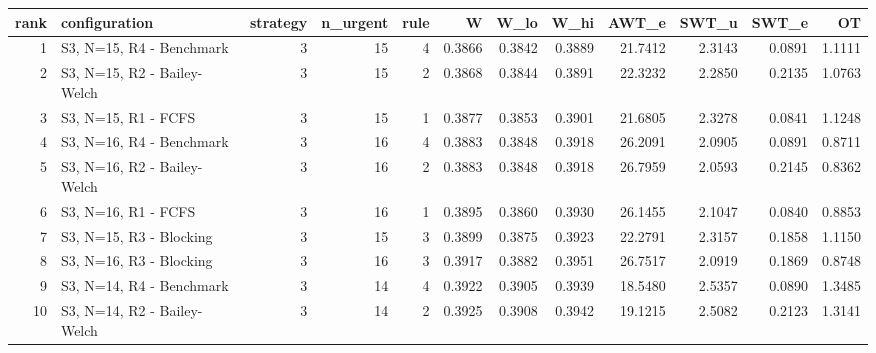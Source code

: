 \begin{tabular}{rlrrrrrrrrrr}
\toprule
rank & configuration & strategy & n_urgent & rule & W & W_lo & W_hi & AWT_e & SWT_u & SWT_e & OT \\
\midrule
1 & S3, N=15, R4 - Benchmark & 3 & 15 & 4 & 0.3866 & 0.3842 & 0.3889 & 21.7412 & 2.3143 & 0.0891 & 1.1111 \\
2 & S3, N=15, R2 - Bailey-Welch & 3 & 15 & 2 & 0.3868 & 0.3844 & 0.3891 & 22.3232 & 2.2850 & 0.2135 & 1.0763 \\
3 & S3, N=15, R1 - FCFS & 3 & 15 & 1 & 0.3877 & 0.3853 & 0.3901 & 21.6805 & 2.3278 & 0.0841 & 1.1248 \\
4 & S3, N=16, R4 - Benchmark & 3 & 16 & 4 & 0.3883 & 0.3848 & 0.3918 & 26.2091 & 2.0905 & 0.0891 & 0.8711 \\
5 & S3, N=16, R2 - Bailey-Welch & 3 & 16 & 2 & 0.3883 & 0.3848 & 0.3918 & 26.7959 & 2.0593 & 0.2145 & 0.8362 \\
6 & S3, N=16, R1 - FCFS & 3 & 16 & 1 & 0.3895 & 0.3860 & 0.3930 & 26.1455 & 2.1047 & 0.0840 & 0.8853 \\
7 & S3, N=15, R3 - Blocking & 3 & 15 & 3 & 0.3899 & 0.3875 & 0.3923 & 22.2791 & 2.3157 & 0.1858 & 1.1150 \\
8 & S3, N=16, R3 - Blocking & 3 & 16 & 3 & 0.3917 & 0.3882 & 0.3951 & 26.7517 & 2.0919 & 0.1869 & 0.8748 \\
9 & S3, N=14, R4 - Benchmark & 3 & 14 & 4 & 0.3922 & 0.3905 & 0.3939 & 18.5480 & 2.5357 & 0.0890 & 1.3485 \\
10 & S3, N=14, R2 - Bailey-Welch & 3 & 14 & 2 & 0.3925 & 0.3908 & 0.3942 & 19.1215 & 2.5082 & 0.2123 & 1.3141 \\
\bottomrule
\end{tabular}
